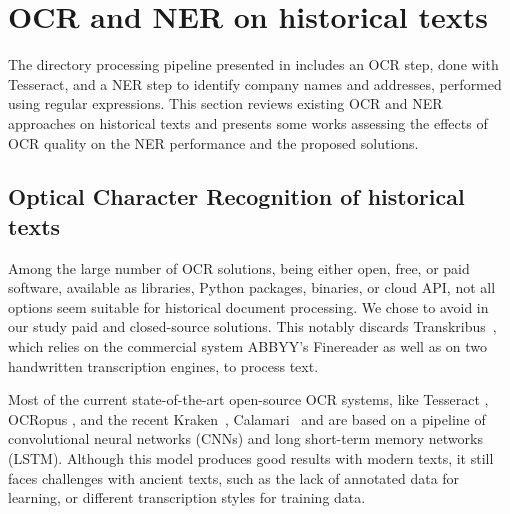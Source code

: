 \section{OCR and NER on historical texts}
\label{sec:related-work}

The directory processing pipeline presented in \cite{bell2020automated} includes an OCR step, done with Tesseract, and a NER step to identify company names and addresses, performed using regular expressions.
This section reviews existing OCR and NER approaches on historical texts and presents some works assessing the effects of OCR quality on the NER performance and the proposed solutions. 

\subsection{Optical Character Recognition of historical texts}
Among the large number of OCR solutions, being either open, free, or paid software, available as libraries, Python packages, binaries, or cloud API, not all options seem suitable for historical document processing.
We chose to avoid in our study paid and closed-source solutions.
This notably discards Transkribus~\cite{transkribus}, which relies on the commercial system ABBYY's Finereader as well as on two handwritten transcription engines, to process text.


Most of the current state-of-the-art open-source OCR systems, like Tesseract \cite{smith2007overview}, OCRopus \cite{breuel2008ocropus}, and the recent Kraken~\cite{kraken}, Calamari~\cite{wick_calamari_2020} and \peroocr \cite{kohut2021ts} are based on a pipeline of convolutional neural networks (CNNs) and long short-term memory networks (LSTM).
Although this model produces good results with modern texts, it still faces challenges with ancient texts, such as the lack of annotated data for learning, or different transcription styles for training data.
%

